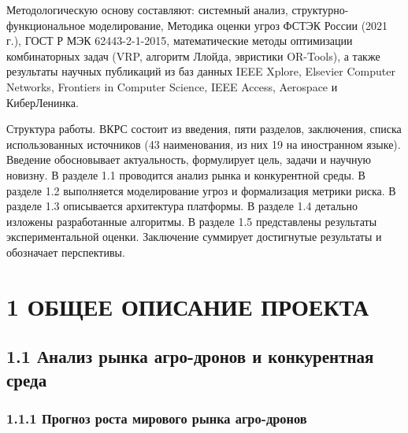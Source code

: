 \documentclass[14pt,a4paper]{extarticle}
\begin{document}
Методологическую основу составляют: системный анализ, структурно-функциональное моделирование, Методика оценки угроз ФСТЭК России (2021 г.), ГОСТ Р МЭК 62443-2-1-2015, математические методы оптимизации комбинаторных задач (VRP, алгоритм Ллойда, эвристики OR-Tools), а также результаты научных публикаций из баз данных IEEE Xplore, Elsevier Computer Networks, Frontiers in Computer Science, IEEE Access, Aerospace и КиберЛенинка.

Структура работы. ВКРС состоит из введения, пяти разделов, заключения, списка использованных источников (43 наименования, из них 19 на иностранном языке). Введение обосновывает актуальность, формулирует цель, задачи и научную новизну. В разделе 1.1 проводится анализ рынка и конкурентной среды. В разделе 1.2 выполняется моделирование угроз и формализация метрики риска. В разделе 1.3 описывается архитектура платформы. В разделе 1.4 детально изложены разработанные алгоритмы. В разделе 1.5 представлены результаты экспериментальной оценки. Заключение суммирует достигнутые результаты и обозначает перспективы.


\hypertarget{ux43eux431ux449ux435ux435-ux43eux43fux438ux441ux430ux43dux438ux435-ux43fux440ux43eux435ux43aux442ux430}{%
\section{1 ОБЩЕЕ ОПИСАНИЕ ПРОЕКТА}\label{ux43eux431ux449ux435ux435-ux43eux43fux438ux441ux430ux43dux438ux435-ux43fux440ux43eux435ux43aux442ux430}}

\hypertarget{ux430ux43dux430ux43bux438ux437-ux440ux44bux43dux43aux430-ux430ux433ux440ux43e-ux434ux440ux43eux43dux43eux432-ux438-ux43aux43eux43dux43aux443ux440ux435ux43dux442ux43dux430ux44f-ux441ux440ux435ux434ux430}{%
\subsection{1.1 Анализ рынка агро-дронов и конкурентная среда}\label{ux430ux43dux430ux43bux438ux437-ux440ux44bux43dux43aux430-ux430ux433ux440ux43e-ux434ux440ux43eux43dux43eux432-ux438-ux43aux43eux43dux43aux443ux440ux435ux43dux442ux43dux430ux44f-ux441ux440ux435ux434ux430}}

\hypertarget{ux43fux440ux43eux433ux43dux43eux437-ux440ux43eux441ux442ux430-ux43cux438ux440ux43eux432ux43eux433ux43e-ux440ux44bux43dux43aux430-ux430ux433ux440ux43e-ux434ux440ux43eux43dux43eux432}{%
\subsubsection{1.1.1 Прогноз роста мирового рынка агро-дронов}\label{ux43fux440ux43eux433ux43dux43eux437-ux440ux43eux441ux442ux430-ux43cux438ux440ux43eux432ux43eux433ux43e-ux440ux44bux43dux43aux430-ux430ux433ux440ux43e-ux434ux440ux43eux43dux43eux432}}
\end{document}

